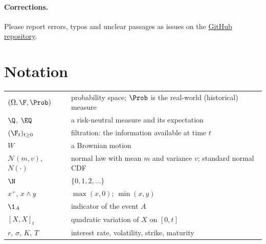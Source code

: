 \paragraph{Corrections.} Please report errors, typos and unclear passages as issues on
the \href{\repourl/issues}{GitHub repository}.

\section*{Notation}
\begin{center}
\begin{tabular}{@{}ll@{}}
\toprule
$(\Omega,\F,\Prob)$ & probability space; $\Prob$ is the real-world (historical) measure\\
$\Q$, $\EQ$ & a risk-neutral measure and its expectation\\
$(\F_t)_{t\ge0}$ & filtration: the information available at time $t$\\
$W$ & a Brownian motion\\
$\mathcal N(m,v)$, $N(\cdot)$ & normal law with mean $m$ and variance $v$; standard normal CDF\\
$\N$ & $\{0,1,2,\dots\}$\\
$x^+$, $x\wedge y$ & $\max(x,0)$; $\min(x,y)$\\
$\1_A$ & indicator of the event $A$\\
$[X,X]_t$ & quadratic variation of $X$ on $[0,t]$\\
$r$, $\sigma$, $K$, $T$ & interest rate, volatility, strike, maturity\\
\bottomrule
\end{tabular}
\end{center}
